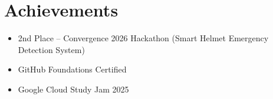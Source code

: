 \documentclass[letterpaper,11pt]{article}
\makeatletter
\newcommand{\resumeItem}[1]{
  \item\small{
    {#1 \vspace{-1pt}}
  }
}
\newcommand{\resumeSubheading}[4]{
  \vspace{-2pt}\item
    \begin{tabular*}{1.0\textwidth}[t]{l@{\extracolsep{\fill}}r}
      \textbf{#1} & \textbf{\small #2} \\
      \textit{\small#3} & \textit{\small #4} \\
    \end{tabular*}\vspace{-7pt}
}
\newcommand{\resumeSubHeadingListStart}{\begin{itemize}[leftmargin=0.0in, label={}]}
\newcommand{\resumeSubHeadingListEnd}{\end{itemize}}
\newcommand{\resumeItemListStart}{\begin{itemize}}
\newcommand{\resumeItemListEnd}{\end{itemize}}
\makeatother
\begin{document}


\section{Achievements}
            \resumeItemListStart
                \resumeItem{2nd Place – Convergence 2026 Hackathon (Smart Helmet Emergency Detection System)}
                \vspace{-7pt}
                \resumeItem{GitHub Foundations Certified}
                \vspace{-7pt}
                \resumeItem{Google Cloud Study Jam 2025}
            \resumeItemListEnd
            


        
\end{document}
